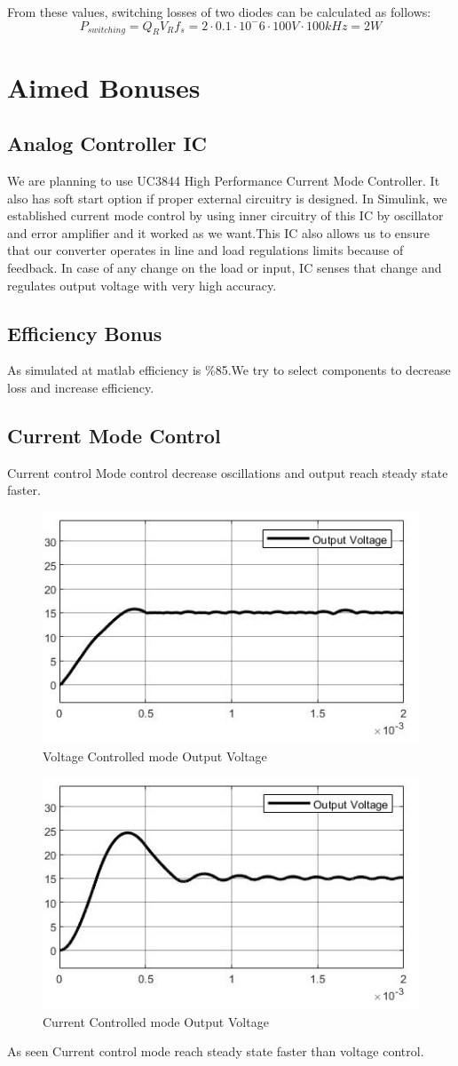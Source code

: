 \documentclass{article}
\begin{document}
From these values, switching losses of two diodes can be calculated as follows:
\begin{equation}
    P_{switching}=Q_RV_Rf_s=2\cdot 0.1\cdot 10^-6\cdot 100V\cdot 100kHz=2W
\end{equation}
\section{Aimed Bonuses}
\subsection{Analog Controller IC}
We are planning to use UC3844 \cite{uc3844} High Performance Current Mode Controller. It also has soft start option if proper external circuitry is designed.
In Simulink, we established current mode control by using inner circuitry of this IC by oscillator and error amplifier and it worked as we want.This IC also allows us to ensure that our converter operates in line and load regulations limits because of feedback. In case of any change on the load or input, IC senses that change and regulates output voltage with very high accuracy.
\subsection{Efficiency Bonus}
As simulated at matlab efficiency is \%85.We try to select components to decrease loss and increase efficiency.
\subsection{Current Mode Control}
Current control Mode control decrease oscillations and output reach steady state faster.
\begin{figure}[H]
    \centering
    \includegraphics[width=0.5\linewidth]{voltage_control.jpg}
    \caption {Voltage Controlled mode Output Voltage}
    \label{fig:voltage_control}
\end{figure}
\begin{figure}[H]
    \centering
    \includegraphics[width=0.5\linewidth]{current_control.jpg}
    \caption {Current Controlled mode Output Voltage}
    \label{fig:current_control}
\end{figure}
As seen Current control mode reach steady state faster than voltage control.
\end{document}
